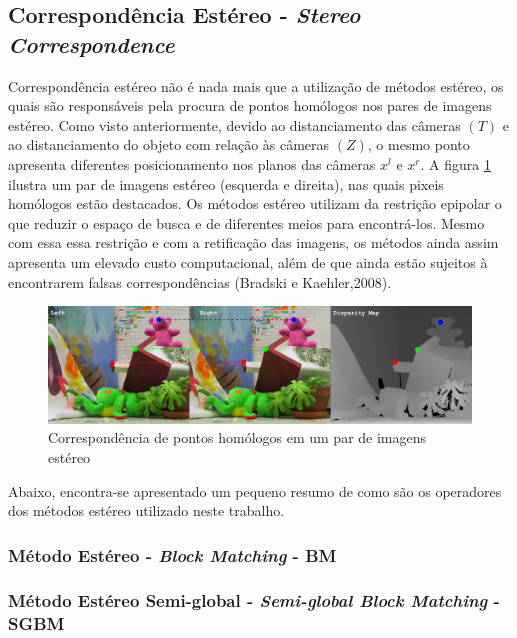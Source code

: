 \subsection{Correspondência Estéreo - \textit{Stereo Correspondence}}
Correspondência estéreo não é nada mais que a utilização de métodos estéreo, os quais são responsáveis pela procura de pontos homólogos nos pares de imagens estéreo. Como visto anteriormente, devido ao distanciamento das câmeras $(T)$ e ao distanciamento do objeto com relação às câmeras $(Z)$, o mesmo ponto apresenta diferentes posicionamento nos planos das câmeras $x^l$ e $x^r$. A figura \ref{homologous_points _stereo} ilustra um par de imagens estéreo (esquerda e direita), nas quais pixeis homólogos estão destacados. Os métodos estéreo utilizam da restrição epipolar o que reduzir o espaço de busca e de diferentes meios para encontrá-los. Mesmo com essa essa restrição e com a retificação das imagens, os métodos ainda assim apresenta um elevado custo computacional, além de que ainda estão sujeitos à encontrarem falsas correspondências (Bradski e Kaehler,2008). 

\begin{figure}[H]
 	\centering
 	\includegraphics[scale=0.35]{./Resources/homologous_points_stereo.png}
 	\caption{Correspondência de pontos homólogos em um par de imagens estéreo}
 	\label{homologous_points _stereo}
\end{figure}

Abaixo, encontra-se apresentado um pequeno resumo de como são os operadores dos métodos estéreo utilizado neste trabalho.

\subsubsection{Método Estéreo - \textit{Block Matching} - BM}

\subsubsection{Método Estéreo Semi-global - \textit{Semi-global Block Matching} - SGBM}


